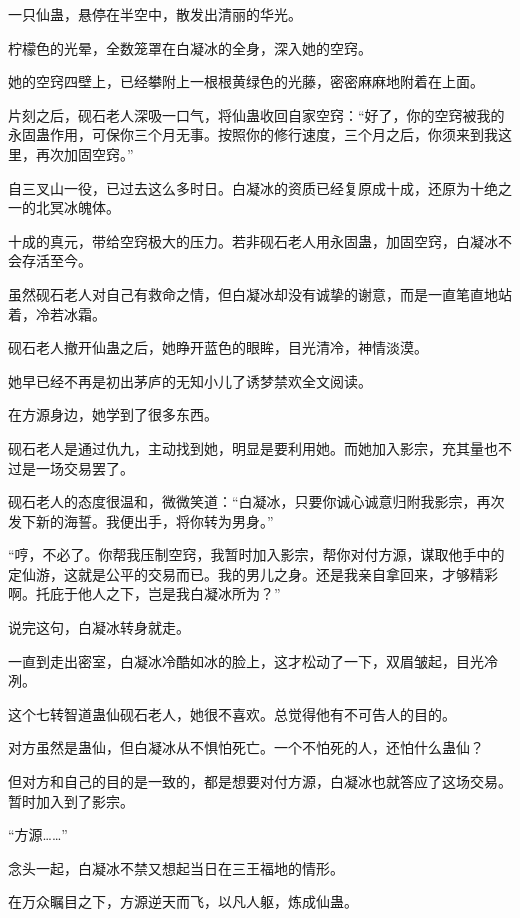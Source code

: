 
\begin{this_body}

一只仙蛊，悬停在半空中，散发出清丽的华光。

柠檬色的光晕，全数笼罩在白凝冰的全身，深入她的空窍。

她的空窍四壁上，已经攀附上一根根黄绿色的光藤，密密麻麻地附着在上面。

片刻之后，砚石老人深吸一口气，将仙蛊收回自家空窍：“好了，你的空窍被我的永固蛊作用，可保你三个月无事。按照你的修行速度，三个月之后，你须来到我这里，再次加固空窍。”

自三叉山一役，已过去这么多时日。白凝冰的资质已经复原成十成，还原为十绝之一的北冥冰魄体。

十成的真元，带给空窍极大的压力。若非砚石老人用永固蛊，加固空窍，白凝冰不会存活至今。

虽然砚石老人对自己有救命之情，但白凝冰却没有诚挚的谢意，而是一直笔直地站着，冷若冰霜。

砚石老人撤开仙蛊之后，她睁开蓝色的眼眸，目光清冷，神情淡漠。

她早已经不再是初出茅庐的无知小儿了诱梦禁欢全文阅读。

在方源身边，她学到了很多东西。

砚石老人是通过仇九，主动找到她，明显是要利用她。而她加入影宗，充其量也不过是一场交易罢了。

砚石老人的态度很温和，微微笑道：“白凝冰，只要你诚心诚意归附我影宗，再次发下新的海誓。我便出手，将你转为男身。”

“哼，不必了。你帮我压制空窍，我暂时加入影宗，帮你对付方源，谋取他手中的定仙游，这就是公平的交易而已。我的男儿之身。还是我亲自拿回来，才够精彩啊。托庇于他人之下，岂是我白凝冰所为？”

说完这句，白凝冰转身就走。

一直到走出密室，白凝冰冷酷如冰的脸上，这才松动了一下，双眉皱起，目光冷冽。

这个七转智道蛊仙砚石老人，她很不喜欢。总觉得他有不可告人的目的。

对方虽然是蛊仙，但白凝冰从不惧怕死亡。一个不怕死的人，还怕什么蛊仙？

但对方和自己的目的是一致的，都是想要对付方源，白凝冰也就答应了这场交易。暂时加入到了影宗。

“方源……”

念头一起，白凝冰不禁又想起当日在三王福地的情形。

在万众瞩目之下，方源逆天而飞，以凡人躯，炼成仙蛊。


\end{this_body}
